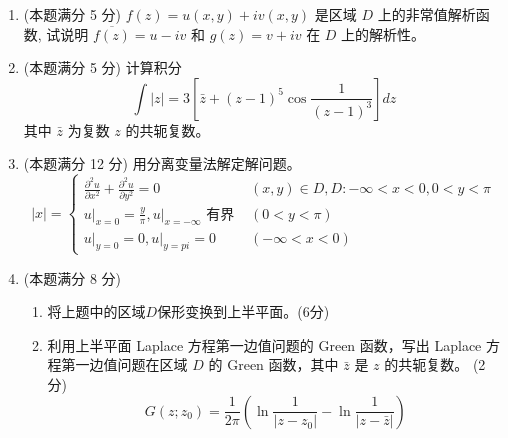 \begin{enumerate}
\banswer{
	
}



\item 
(本题满分 5 分)
$f(z)=u(x, y)+i v(x, y)$ 是区域 $D$ 上的非常值解析函数, 试说明 $\overline{f(z)}=u-i v$ 和 $g(z)=v+i v$ 在 $D$ 上的解析性。

\banswer{
	
}



\newpage
\item 
(本题满分 5 分)
计算积分
\[
\int|z|=3\left[\bar{z}+(z-1)^{5} \cos \frac{1}{(z-1)^{3}}\right] d z
\]
其中 $\bar{z}$ 为复数 $z$ 的共轭复数。

\banswer{
	
}


\item 
(本题满分 12 分)
用分离变量法解定解问题。
\[
|x|=\left\{\begin{array}{ll}
	\frac{\partial^{2} u}{\partial x^{2}}+\frac{\partial^{2} u}{\partial y^{2}}=0 & (x, y) \in D, D:-\infty<x<0,0<y<\pi \\
	\left.u\right|_{x=0}=\frac{y}{\pi},\left.u\right|_{x=-\infty} \text { 有界 } & (0<y<\pi) \\
	\left.u\right|_{y=0}=0,\left.u\right|_{y=p i}=0 & (-\infty<x<0)
\end{array}\right.
\]


\banswer{
	
}


\item 
(本题满分 8 分)
\begin{enumerate}
	\item
	将上题中的区域$  D  $保形变换到上半平面。(6分)
	\item 
 利用上半平面 Laplace 方程第一边值问题的 Green 函数，写出 Laplace 方程第一边值问题在区域 $D$ 的 Green 函数，其中 $\bar{z}$ 是 $z$ 的共轭复数。 (2分)
	\[
	G\left(z ; z_{0}\right)=\frac{1}{2 \pi}\left(\ln \frac{1}{\left|z-z_{0}\right|}-\ln \frac{1}{|z-\bar{z}|}\right)
	\]
	
	
	
\end{enumerate}

\banswer{
	
}

	
\end{enumerate}


